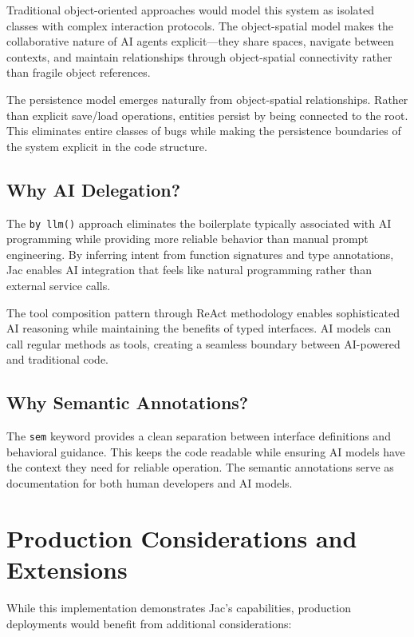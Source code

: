 Traditional object-oriented approaches would model this system as isolated classes with complex interaction protocols. The object-spatial model makes the collaborative nature of AI agents explicit—they share spaces, navigate between contexts, and maintain relationships through object-spatial connectivity rather than fragile object references.

The persistence model emerges naturally from object-spatial relationships. Rather than explicit save/load operations, entities persist by being connected to the root. This eliminates entire classes of bugs while making the persistence boundaries of the system explicit in the code structure.

\subsection{Why AI Delegation?}

The \texttt{by llm()} approach eliminates the boilerplate typically associated with AI programming while providing more reliable behavior than manual prompt engineering. By inferring intent from function signatures and type annotations, Jac enables AI integration that feels like natural programming rather than external service calls.

The tool composition pattern through ReAct methodology enables sophisticated AI reasoning while maintaining the benefits of typed interfaces. AI models can call regular methods as tools, creating a seamless boundary between AI-powered and traditional code.

\subsection{Why Semantic Annotations?}

The \texttt{sem} keyword provides a clean separation between interface definitions and behavioral guidance. This keeps the code readable while ensuring AI models have the context they need for reliable operation. The semantic annotations serve as documentation for both human developers and AI models.

\section{Production Considerations and Extensions}

While this implementation demonstrates Jac's capabilities, production deployments would benefit from additional considerations:

